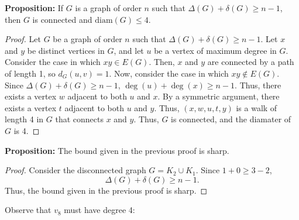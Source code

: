 \documentclass[12pt]{article}
\begin{document}
\bigskip
{}

{\bf Proposition:} If $G$ is a graph of order $n$ such that $\Delta(G) + \delta(G) \geq n - 1$, then $G$ is connected and $\text{diam}(G) \leq 4$.
\begin{proof}
    Let $G$ be a graph of order $n$ such that $\Delta(G) + \delta(G) \geq n - 1$.
    Let $x$ and $y$ be distinct vertices in $G$, and let $u$ be a vertex of maximum degree in $G$.
    Consider the case in which $xy \in E(G)$.
    Then, $x$ and $y$ are connected by a path of length 1, so $d_G(u,v) = 1$.
    Now, consider the case in which $xy \notin E(G)$.
    Since $\Delta(G) + \delta(G) \geq n - 1$, $\deg(u) + \deg(x) \geq n - 1$.
    Thus, there exists a vertex $w$ adjacent to both $u$ and $x$.
    By a symmetric argument, there exists a vertex $t$ adjacent to both $u$ and $y$.
    Thus, $(x, w, u, t, y)$ is a walk of length 4 in $G$ that connects $x$ and $y$.
    Thus, $G$ is connected, and the diamater of $G$ is 4.
\end{proof}


{\bf Proposition:} The bound given in the previous proof is sharp.
\begin{proof}
    Consider the disconnected graph $G = K_2 \cup K_1$.
    Since $1 + 0 \geq 3 - 2$, $$\Delta(G) + \delta(G) \geq n - 1.$$
    Thus, the bound given in the previous proof is sharp.
\end{proof}

\newpage
{}

Observe that $v_8$ must have degree 4:
\end{document}
